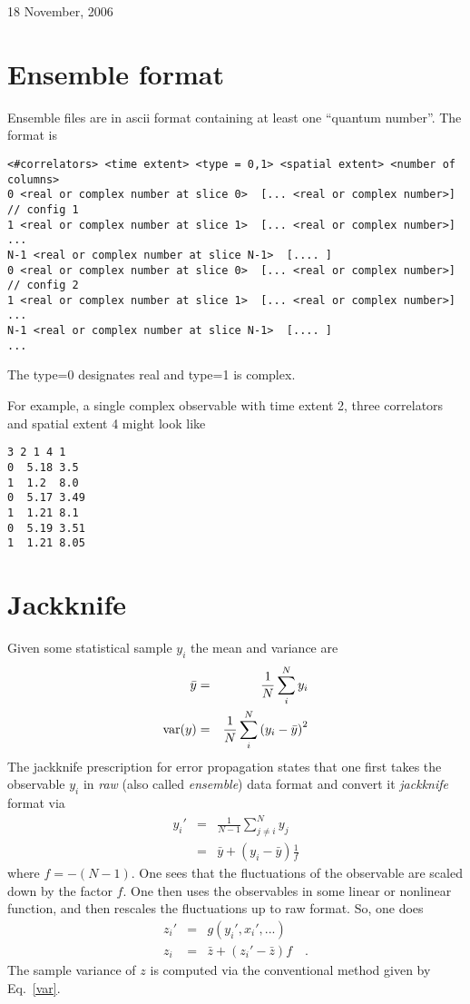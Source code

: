 \documentclass[12pt]{article}
\begin{document}
\begin{center}
\vspace{2mm}

18 November, 2006
\end{center}

\section{Ensemble format}

Ensemble files are in ascii format containing at least one ``quantum number''.
The format is
\begin{verbatim}
<#correlators> <time extent> <type = 0,1> <spatial extent> <number of columns>
0 <real or complex number at slice 0>  [... <real or complex number>]   // config 1
1 <real or complex number at slice 1>  [... <real or complex number>]
...
N-1 <real or complex number at slice N-1>  [.... ]
0 <real or complex number at slice 0>  [... <real or complex number>]   // config 2
1 <real or complex number at slice 1>  [... <real or complex number>]
...
N-1 <real or complex number at slice N-1>  [.... ]
...
\end{verbatim}
The {\rm type=0} designates {\rm real} and {\rm type=1} is {\rm complex}.

For example, a single complex observable with time extent 2, three correlators
and spatial extent 4 might look like
\begin{verbatim}
3 2 1 4 1
0  5.18 3.5
1  1.2  8.0
0  5.17 3.49
1  1.21 8.1
0  5.19 3.51
1  1.21 8.05
\end{verbatim}

\section{Jackknife}

Given some statistical sample $y_i$ the mean and variance are
\begin{eqnarray}
\bar{y} &=& \frac{1}{N}\sum_i^N y_i\\
{\rm var}(y) &=& \frac{1}{N}\sum_i^N \left(y_i - \bar{y}\right)^2\label{var}
\end{eqnarray}
The jackknife prescription for error propagation states that one first
takes the observable $y_i$ in {\em raw} (also called {\em ensemble})
data format and convert it {\em jackknife} format via
\begin{eqnarray}
y_i' &=& \frac{1}{N-1}\sum_{j\ne i}^N y_j \\
     &=& \bar{y} + \left(y_i - \bar{y}\right) \frac{1}{f} \label{jack}
\end{eqnarray}
where $f=-(N-1)$. One sees that the fluctuations of the observable
are scaled down by the factor $f$. One then uses the observables in some
linear or nonlinear function, and then rescales the fluctuations up to raw
format. So, one does
\begin{eqnarray}
z_i' &=& g(y_i',x_i',...)\label{nonlinear}\\
z_i  &=& \bar{z} + \left(z_i' - \bar{z}\right) f \quad.
\end{eqnarray}
The sample variance of $z$ is computed via the conventional method given 
by Eq.~\ref{var}.
\end{document}
